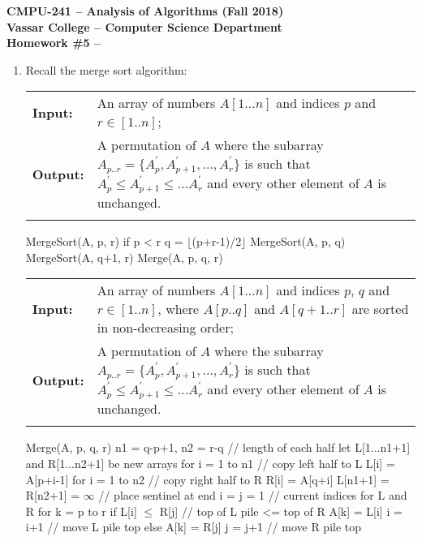 \documentclass[12pt]{article}
\begin{document}
\begin{center}
{ \Large \bf CMPU-241 -- Analysis of Algorithms (Fall 2018)}\\
  \vspace{.05in}
{\large \bf Vassar College -- Computer Science Department}\\
  \vspace{.05in}
  {\bf Homework \#5 -- \\
 }
  \vspace{.15in}

\end{center}

\begin{enumerate}

\item Recall the merge sort algorithm:

\begin{tabular}{ p{1.4cm} p{13.3cm} }
{\bf Input:} & An array of numbers $A[1\dots n]$ and indices $p$ and $r\in[1..n]$; \\
{\bf Output:}  & A permutation of $A$ where the subarray $A_{p..r} = \{A_p^{'},A_{p+1}^{'},\dots,A_r^{'}\}$ is such that $A_p^{'} \leq A_{p+1}^{'}\leq \dots A_r^{'}$ and every other element of $A$ is unchanged.\\\\
\end{tabular}
\begin{algorithm}[]
MergeSort(A, p, r)
  if p < r
    q = $\lfloor$(p+r-1)/2$\rfloor$
    MergeSort(A, p, q)
    MergeSort(A, q+1, r)
    Merge(A, p, q, r)
\end{algorithm}

\begin{tabular}{ p{1.4cm} p{13.3cm} }
{\bf Input:} &An array of numbers $A[1\dots n]$ and indices $p$, $q$ and $r\in[1..n]$, where $A[p..q]$ and $A[q+1..r]$ are sorted in non-decreasing order; \\
{\bf Output:}  & A permutation of $A$ where the subarray $A_{p..r} = \{A_p^{'},A_{p+1}^{'},\dots,A_r^{'}\}$ is such that $A_p^{'} \leq A_{p+1}^{'}\leq \dots A_r^{'}$ and every other element of $A$ is unchanged. \\\\
\end{tabular}
\begin{algorithm}[]
Merge(A, p, q, r)
  n1 = q-p+1, n2 = r-q            // length of each half
  let L[1...n1+1] and R[1...n2+1] be new arrays
  for i = 1 to n1		  // copy left half to L 
    L[i] = A[p+i-1]
  for i = 1 to n2		  // copy right half to R
    R[i] = A[q+i]
  L[n1+1] = R[n2+1] = $\infty$            // place sentinel at end
  i = j = 1                       // current indices for L and R
  for k = p to r       
    if L[i] $\leq$ R[j]		  // top of L pile <= top of R 
      A[k] = L[i]
      i = i+1			  // move L pile top
    else A[k] = R[j]	
      j = j+1                     // move R pile top
\end{algorithm}


\end{enumerate}
\end{document}
